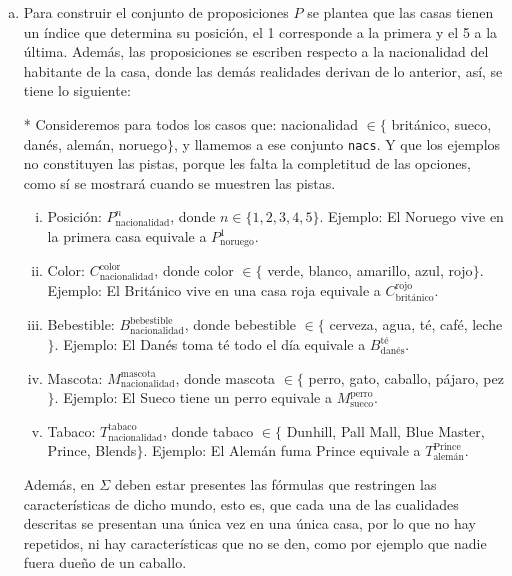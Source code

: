 \documentclass[letterpaper,10pt]{article}
\begin{document}
\begin{enumerate}[a)]
\item Para construir el conjunto de proposiciones $P$ se plantea que las casas tienen un índice que determina su posición, el 1 corresponde a la primera y el 5 a la última. Además, las proposiciones se escriben respecto a la nacionalidad del habitante de la casa, donde las demás realidades derivan de lo anterior, así, se tiene lo siguiente:

* Consideremos para todos los casos que: nacionalidad $\in \{$ británico, sueco, danés, alemán, noruego$\}$, y llamemos a ese conjunto \texttt{nacs}. Y que los ejemplos no constituyen las pistas, porque les falta la completitud de las opciones, como sí se mostrará cuando se muestren las pistas.

\begin{enumerate}[i.]
    \item Posición: $P_\text{nacionalidad}^n$, donde $n\in\{1,2,3,4,5\}$.
    Ejemplo: El Noruego vive en la primera casa equivale a $P_\text{noruego}^1$.

    \item Color: $C_\text{nacionalidad}^\text{color}$, donde color $\in \{$ verde, blanco, amarillo, azul, rojo$\}$.
    Ejemplo: El Británico vive en una casa roja equivale a $C_\text{británico}^\text{rojo}$.

    \item Bebestible: $B_\text{nacionalidad}^\text{bebestible}$, donde bebestible $\in \{$ cerveza, agua, té, café, leche$\}$.
    Ejemplo: El Danés toma té todo el día equivale a $B_\text{danés}^\text{té}$.

    \item Mascota: $M_\text{nacionalidad}^\text{mascota}$, donde mascota $\in \{$ perro, gato, caballo, pájaro, pez$\}$.
    Ejemplo: El Sueco tiene un perro equivale a $M_\text{sueco}^\text{perro}$.

    \item Tabaco: $T_\text{nacionalidad}^\text{tabaco}$, donde tabaco $\in \{$ Dunhill, Pall Mall, Blue Master, Prince, Blends$\}$.
    Ejemplo: El Alemán fuma Prince equivale a $T_\text{alemán}^\text{Prince}$.
\end{enumerate}

Además, en $\Sigma$ deben estar presentes las fórmulas que restringen las características de dicho mundo, esto es, que cada una de las cualidades descritas se presentan una única vez en una única casa, por lo que no hay repetidos, ni hay características que no se den, como por ejemplo que nadie fuera dueño de un caballo.


\end{enumerate}
\end{document}
